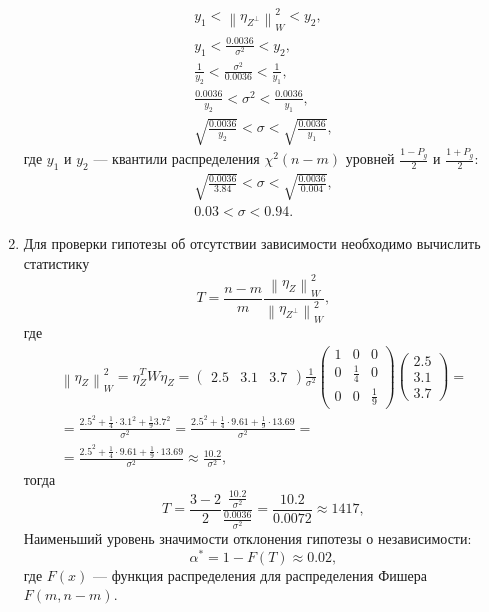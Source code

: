 \documentclass[a4paper,12pt]{article}
\newcommand{\norm}[1]{\left \| #1 \right \|}
\newcommand{\pr}[2]{#1_{#2}}
\newcommand{\pro}[2]{#1_{#2^\perp}}
\begin{document}
\begin{enumerate}
          \begin{gather*}
              y_1 < \norm{\pro{\eta}{Z}}_W^2 < y_2 , \\
              y_1 < \frac{0.0036}{\sigma^2} < y_2 , \\
              \frac{1}{y_2} < \frac{\sigma^2}{0.0036} < \frac{1}{y_1} , \\
              \frac{0.0036}{y_2} < \sigma^2 < \frac{0.0036}{y_1} , \\
              \sqrt{\frac{0.0036}{y_2}} < \sigma < \sqrt{\frac{0.0036}{y_1}} ,
          \end{gather*}
          где $y_1$ и $y_2$ --- квантили распределения $\chi^2(n-m)$ уровней $\frac{1-P_g}{2}$ и $\frac{1+P_g}{2}$:
          \begin{gather*}
              \sqrt{\frac{0.0036}{3.84}} < \sigma < \sqrt{\frac{0.0036}{0.004}} , \\
              0.03 < \sigma < 0.94 .
          \end{gather*}

    \item Для проверки гипотезы об отсутствии зависимости необходимо вычислить статистику
          \[
              T = \frac{n-m}{m} \frac{\norm{\pr{\eta}{Z}}_W^2}{\norm{\pro{\eta}{Z}}_W^2} ,
          \]
          где
          \begin{multline*}
              \norm{\pr{\eta}{Z}}_W^2
              = \pr{\eta}{Z}^T W \pr{\eta}{Z}
              = \begin{pmatrix}
                  2.5 & 3.1 & 3.7
              \end{pmatrix}
              \frac{1}{\sigma^2}
              \begin{pmatrix}
                  1 & 0           & 0           \\
                  0 & \frac{1}{4} & 0           \\
                  0 & 0           & \frac{1}{9}
              \end{pmatrix}
              \begin{pmatrix}
                  2.5 \\
                  3.1 \\
                  3.7
              \end{pmatrix} = \\
              = \frac{2.5^2 + \frac{1}{4} \cdot 3.1^2 + \frac{1}{9} 3.7^2}{\sigma^2}
              = \frac{2.5^2 + \frac{1}{4} \cdot 9.61 + \frac{1}{9} \cdot 13.69}{\sigma^2} = \\
              = \frac{2.5^2 + \frac{1}{4} \cdot 9.61 + \frac{1}{9} \cdot 13.69}{\sigma^2}
              \approx \frac{10.2}{\sigma^2} ,
          \end{multline*}
          тогда
          \[
              T
              = \frac{3-2}{2} \frac{\frac{10.2}{\sigma^2}}{\frac{0.0036}{\sigma^2}}
              = \frac{10.2}{0.0072}
              \approx 1417,
          \]
          Наименьший уровень значимости отклонения гипотезы о независимости:
          \[
              \alpha^*
              = 1 - F(T)
              \approx 0.02 ,
          \]
          где $F(x)$ --- функция распределения для распределения Фишера $F(m,n-m)$.

\end{enumerate}
\end{document}
